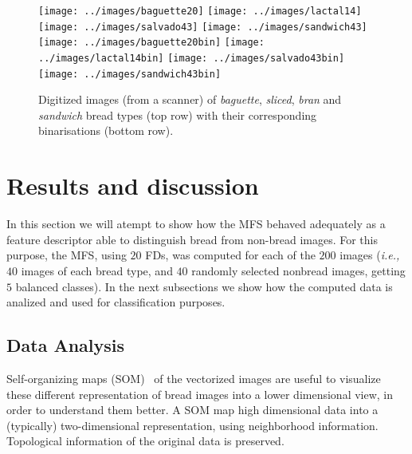 
\begin{figure}[htb]
\centering
\texttt{[image: ../images/baguette20]}
\texttt{[image: ../images/lactal14]}
\texttt{[image: ../images/salvado43]}
\texttt{[image: ../images/sandwich43]}
\texttt{[image: ../images/baguette20bin]}
\texttt{[image: ../images/lactal14bin]}
\texttt{[image: ../images/salvado43bin]}
\texttt{[image: ../images/sandwich43bin]}
\caption{Digitized images (from a scanner) of {\em baguette}, {\em sliced}, {\em bran} and {\em sandwich} bread types (top row) with their corresponding binarisations (bottom row).}
\label{fig:bread}
\end{figure}


\section{Results and discussion}
\label{sec:9}

In this section we will atempt to show how the MFS behaved adequately as a feature descriptor able to distinguish bread from non-bread images. For this purpose, the MFS, using $20$ FDs, was computed for each of the $200$ images ({\em i.e.,} $40$ images of each bread type, and $40$ randomly selected nonbread images, getting $5$ balanced classes). In the next subsections we show how the computed data is analized and used for classification purposes.


\subsection{Data Analysis}
\label{sec:11}

Self-organizing maps (SOM)~\cite{Kohonen2001} of the vectorized images are useful to visualize these different representation of bread images into a lower dimensional view, in order to understand them better. A SOM map high dimensional data into a (typically) two-dimensional representation, using neighborhood information. Topological information of the original data is preserved.  

